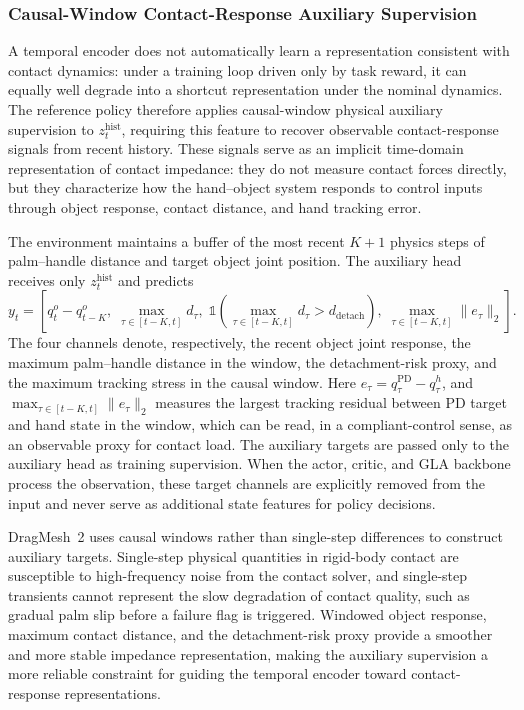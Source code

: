 \documentclass{llmxive}
\begin{document}
\subsubsection{Causal-Window Contact-Response Auxiliary Supervision}
\label{sec:aux}

A temporal encoder does not automatically learn a representation
consistent with contact dynamics: under a training loop driven only
by task reward, it can equally well degrade into a shortcut
representation under the nominal dynamics. The reference policy
therefore applies causal-window physical auxiliary supervision to
$z_t^{\mathrm{hist}}$, requiring this feature to recover observable
contact-response signals from recent history. These signals serve as
an implicit time-domain representation of contact impedance: they do
not measure contact forces directly, but they characterize how the
hand--object system responds to control inputs through object
response, contact distance, and hand tracking error.

The environment maintains a buffer of the most recent $K+1$ physics
steps of palm--handle distance and target object joint position. The
auxiliary head receives only $z_t^{\mathrm{hist}}$ and predicts
\begin{equation}
y_t = \left[
q_t^o-q_{t-K}^o,\;
\max_{\tau\in[t-K,t]}d_\tau,\;
\mathbb{1}\!\left(\max_{\tau\in[t-K,t]}d_\tau>d_{\mathrm{detach}}\right),\;
\max_{\tau\in[t-K,t]}\lVert e_\tau\rVert_2
\right].
\label{eq:aux}
\end{equation}
The four channels denote, respectively, the recent object joint
response, the maximum palm--handle distance in the window, the
detachment-risk proxy, and the maximum tracking stress in the
causal window. Here $e_\tau = q_\tau^{\mathrm{PD}} - q_\tau^h$, and
$\max_{\tau\in[t-K,t]}\lVert e_\tau\rVert_2$ measures the largest
tracking residual between PD target and hand state in the window,
which can be read, in a compliant-control sense, as an observable
proxy for contact load. The auxiliary targets are passed only to the
auxiliary head as training supervision. When the actor, critic, and
GLA backbone process the observation, these target channels are
explicitly removed from the input and never serve as additional
state features for policy decisions.

DragMesh~2 uses causal windows rather than single-step differences
to construct auxiliary targets. Single-step physical quantities in
rigid-body contact are susceptible to high-frequency noise from the
contact solver, and single-step transients cannot represent the slow
degradation of contact quality, such as gradual palm slip before a
failure flag is triggered. Windowed object response, maximum contact
distance, and the detachment-risk proxy provide a smoother and more
stable impedance representation, making the auxiliary supervision a
more reliable constraint for guiding the temporal encoder toward
contact-response representations.
\end{document}
